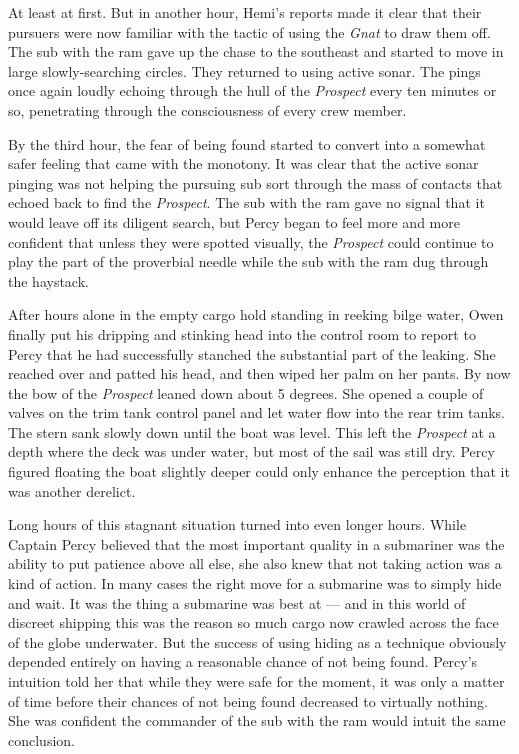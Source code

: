 \documentclass[
]{scrbook}
\begin{document}
At least at first. But in another hour, Hemi's reports made it clear
that their pursuers were now familiar with the tactic of using the
\emph{Gnat} to draw them off. The sub with the ram gave up the chase to
the southeast and started to move in large slowly-searching circles.
They returned to using active sonar. The pings once again loudly echoing
through the hull of the \emph{Prospect} every ten minutes or so,
penetrating through the consciousness of every crew member.

By the third hour, the fear of being found started to convert into a
somewhat safer feeling that came with the monotony. It was clear that
the active sonar pinging was not helping the pursuing sub sort through
the mass of contacts that echoed back to find the \emph{Prospect}. The
sub with the ram gave no signal that it would leave off its diligent
search, but Percy began to feel more and more confident that unless they
were spotted visually, the \emph{Prospect} could continue to play the
part of the proverbial needle while the sub with the ram dug through the
haystack.

After hours alone in the empty cargo hold standing in reeking bilge
water, Owen finally put his dripping and stinking head into the control
room to report to Percy that he had successfully stanched the
substantial part of the leaking. She reached over and patted his head,
and then wiped her palm on her pants. By now the bow of the
\emph{Prospect} leaned down about 5 degrees. She opened a couple of
valves on the trim tank control panel and let water flow into the rear
trim tanks. The stern sank slowly down until the boat was level. This
left the \emph{Prospect} at a depth where the deck was under water, but
most of the sail was still dry. Percy figured floating the boat slightly
deeper could only enhance the perception that it was another derelict.

Long hours of this stagnant situation turned into even longer hours.
While Captain Percy believed that the most important quality in a
submariner was the ability to put patience above all else, she also knew
that not taking action was a kind of action. In many cases the right
move for a submarine was to simply hide and wait. It was the thing a
submarine was best at --- and in this world of discreet shipping this
was the reason so much cargo now crawled across the face of the globe
underwater. But the success of using hiding as a technique obviously
depended entirely on having a reasonable chance of not being found.
Percy's intuition told her that while they were safe for the moment, it
was only a matter of time before their chances of not being found
decreased to virtually nothing. She was confident the commander of the
sub with the ram would intuit the same conclusion.
\end{document}
